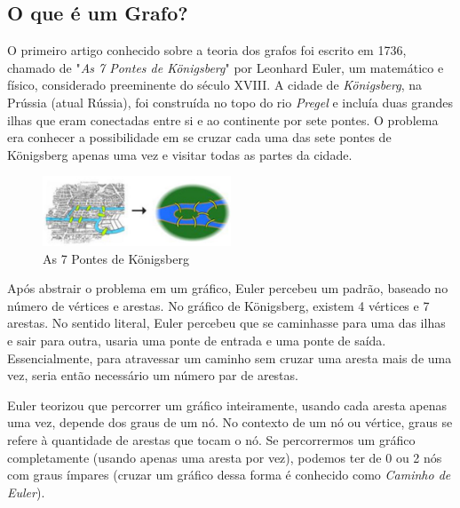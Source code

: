 \documentclass[a4paper,11pt]{article}
\begin{document}
\subsection{O que é um Grafo?}
O primeiro artigo conhecido sobre a teoria dos grafos foi escrito em 1736, chamado de "\textit{As 7 Pontes de Königsberg}" por Leonhard Euler, um matemático e físico, considerado preeminente do século XVIII. A cidade de \textit{Königsberg}, na Prússia (atual Rússia), foi construída no topo do rio \textit{Pregel} e incluía duas grandes ilhas que eram conectadas entre si e ao continente por sete pontes. O problema era conhecer a possibilidade em se cruzar cada uma das sete pontes de Königsberg apenas uma vez e visitar todas as partes da cidade.
\begin{figure}[H]
	\centering
	\includegraphics[width=0.5\textwidth]{imagens/pontes}
	\caption{As 7 Pontes de Königsberg}
\end{figure}

Após abstrair o problema em um gráfico, Euler percebeu um padrão, baseado no número de vértices e arestas. No gráfico de Königsberg, existem 4 vértices e 7 arestas. No sentido literal, Euler percebeu que se caminhasse para uma das ilhas e sair para outra, usaria uma ponte de entrada e uma ponte de saída. Essencialmente, para atravessar um caminho sem cruzar uma aresta mais de uma vez, seria então necessário um número par de arestas.

Euler teorizou que percorrer um gráfico inteiramente, usando cada aresta apenas uma vez, depende dos graus de um nó. No contexto de um nó ou vértice, graus se refere à quantidade de arestas que tocam o nó. Se percorrermos um gráfico completamente (usando apenas uma aresta por vez), podemos ter de 0 ou 2 nós com graus ímpares (cruzar um gráfico dessa forma é conhecido como \textit{Caminho de Euler}). 
\end{document}
